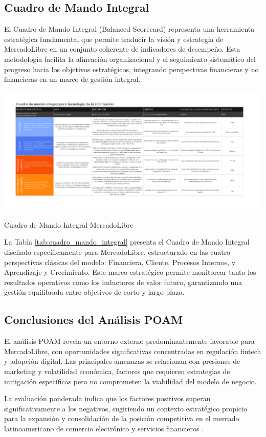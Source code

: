 \subsection{Cuadro de Mando Integral}

El Cuadro de Mando Integral (Balanced Scorecard) representa una herramienta estratégica fundamental que permite traducir la visión y estrategia de MercadoLibre en un conjunto coherente de indicadores de desempeño. Esta metodología facilita la alineación organizacional y el seguimiento sistemático del progreso hacia los objetivos estratégicos, integrando perspectivas financieras y no financieras en un marco de gestión integral.

\begin{table}[H]
    \centering
    \includegraphics[width=\linewidth, height=0.8\textheight, keepaspectratio]{sections/Cuadro_Mando_Mercado_Libre.pdf}
    \caption{Cuadro de Mando Integral MercadoLibre}
    \label{tab:cuadro_mando_integral}
\end{table}

La Tabla \ref{tab:cuadro_mando_integral} presenta el Cuadro de Mando Integral diseñado específicamente para MercadoLibre, estructurado en las cuatro perspectivas clásicas del modelo: Financiera, Cliente, Procesos Internos, y Aprendizaje y Crecimiento. Este marco estratégico permite monitorear tanto los resultados operativos como los inductores de valor futuro, garantizando una gestión equilibrada entre objetivos de corto y largo plazo.

\subsection{Conclusiones del Análisis POAM}

El análisis POAM revela un entorno externo predominantemente favorable para MercadoLibre, con oportunidades significativas concentradas en regulación fintech y adopción digital. Las principales amenazas se relacionan con presiones de marketing y volatilidad económica, factores que requieren estrategias de mitigación específicas pero no comprometen la viabilidad del modelo de negocio.

La evaluación ponderada indica que los factores positivos superan significativamente a los negativos, sugiriendo un contexto estratégico propicio para la expansión y consolidación de la posición competitiva en el mercado latinoamericano de comercio electrónico y servicios financieros \autocite{porter1985}.
